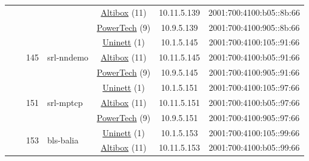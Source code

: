 \begin{small}
\begin{center}
\begin{longtable}{|c|c|c|c|c|c|c|c|}
  &  &  &  & \multicolumn{2}{|c|}{\tiny{\href{https://www.altibox.no}{Altibox} (11)}} & \tiny{10.11.5.139} & \tiny{2001:700:4100:b05::8b:66} \\* \cline{5-5}\cline{6-6}\cline{7-7}\cline{8-8}
  &  &  &  & \multicolumn{2}{|c|}{\tiny{\href{http://www.powertech.no}{PowerTech} (9)}} & \tiny{10.9.5.139} & \tiny{2001:700:4100:905::8b:66} \\* \cline{3-3}\cline{4-4}\cline{5-5}\cline{6-6}\cline{7-7}\cline{8-8}
  &  & \multirow{3}{*}{\tiny{145}} & \multicolumn{1}{|l|}{\multirow{3}{*}{\tiny{srl-nndemo}}} & \multicolumn{2}{|c|}{\tiny{\href{https://www.uninett.no}{Uninett} (1)}} & \tiny{10.1.5.145} & \tiny{2001:700:4100:105::91:66} \\* \cline{5-5}\cline{6-6}\cline{7-7}\cline{8-8}
  &  &  &  & \multicolumn{2}{|c|}{\tiny{\href{https://www.altibox.no}{Altibox} (11)}} & \tiny{10.11.5.145} & \tiny{2001:700:4100:b05::91:66} \\* \cline{5-5}\cline{6-6}\cline{7-7}\cline{8-8}
  &  &  &  & \multicolumn{2}{|c|}{\tiny{\href{http://www.powertech.no}{PowerTech} (9)}} & \tiny{10.9.5.145} & \tiny{2001:700:4100:905::91:66} \\* \cline{3-3}\cline{4-4}\cline{5-5}\cline{6-6}\cline{7-7}\cline{8-8}
  &  & \multirow{3}{*}{\tiny{151}} & \multicolumn{1}{|l|}{\multirow{3}{*}{\tiny{srl-mptcp}}} & \multicolumn{2}{|c|}{\tiny{\href{https://www.uninett.no}{Uninett} (1)}} & \tiny{10.1.5.151} & \tiny{2001:700:4100:105::97:66} \\* \cline{5-5}\cline{6-6}\cline{7-7}\cline{8-8}
  &  &  &  & \multicolumn{2}{|c|}{\tiny{\href{https://www.altibox.no}{Altibox} (11)}} & \tiny{10.11.5.151} & \tiny{2001:700:4100:b05::97:66} \\* \cline{5-5}\cline{6-6}\cline{7-7}\cline{8-8}
  &  &  &  & \multicolumn{2}{|c|}{\tiny{\href{http://www.powertech.no}{PowerTech} (9)}} & \tiny{10.9.5.151} & \tiny{2001:700:4100:905::97:66} \\* \cline{3-3}\cline{4-4}\cline{5-5}\cline{6-6}\cline{7-7}\cline{8-8}
  &  & \multirow{3}{*}{\tiny{153}} & \multicolumn{1}{|l|}{\multirow{3}{*}{\tiny{bls-balia}}} & \multicolumn{2}{|c|}{\tiny{\href{https://www.uninett.no}{Uninett} (1)}} & \tiny{10.1.5.153} & \tiny{2001:700:4100:105::99:66} \\* \cline{5-5}\cline{6-6}\cline{7-7}\cline{8-8}
  &  &  &  & \multicolumn{2}{|c|}{\tiny{\href{https://www.altibox.no}{Altibox} (11)}} & \tiny{10.11.5.153} & \tiny{2001:700:4100:b05::99:66} \\* \cline{5-5}\cline{6-6}\cline{7-7}\cline{8-8}

\end{longtable}
\end{center}
\end{small}

